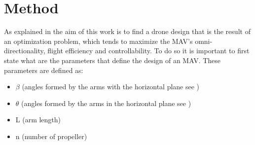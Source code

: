 \chapter{Method}
\label{sec:method}
As explained in  the aim of this work is to find a drone
design that is the result of an optimization problem, which tends to maximize the
MAV's omni-directionality, flight efficiency and controllability. To do so it is
important to first state what are the parameters that define the design of an MAV.
These parameters are defined as:

\begin{itemize}
\item $\beta$  (angles formed by the arms with the horizontal plane see )
\item $\theta$ (angles formed by the arms in the horizontal plane see )
\item L (arm length)
\item n (number of propeller)
\end{itemize}

